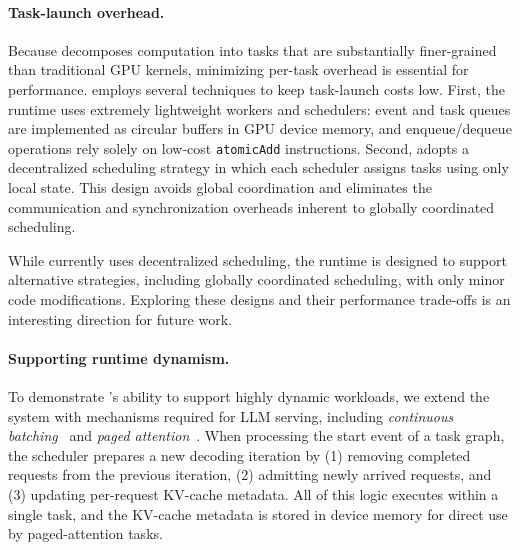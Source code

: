 \paragraph{Task-launch overhead.}
Because \sys decomposes computation into tasks that are substantially finer-grained than traditional GPU kernels, minimizing per-task overhead is essential for performance. \sys employs several techniques to keep task-launch costs low.
First, the runtime uses extremely lightweight workers and schedulers: event and task queues are implemented as circular buffers in GPU device memory, and enqueue/dequeue operations rely solely on low-cost {\tt atomicAdd} instructions.
Second, \sys adopts a decentralized scheduling strategy in which each scheduler assigns tasks using only local state. This design avoids global coordination and eliminates the communication and synchronization overheads inherent to globally coordinated scheduling.

While \sys currently uses decentralized scheduling, the runtime is designed to support alternative strategies, including globally coordinated scheduling, with only minor code modifications. Exploring these designs and their performance trade-offs is an interesting direction for future work.


\paragraph{Supporting runtime dynamism.}
To demonstrate \sys’s ability to support highly dynamic workloads, we extend the system with mechanisms required for LLM serving, including {\em continuous batching}~\cite{yu2022orca} and {\em paged attention}~\cite{kwon2023vllm}. When processing the start event of a task graph, the scheduler prepares a new decoding iteration by (1) removing completed requests from the previous iteration, (2) admitting newly arrived requests, and (3) updating per-request KV-cache metadata. All of this logic executes within a single task, and the KV-cache metadata is stored in device memory for direct use by paged-attention tasks.

